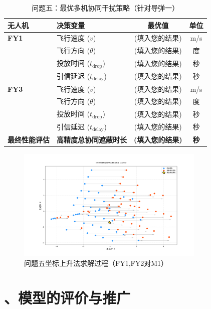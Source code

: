 \documentclass[12pt]{article}
\begin{document}
\begin{CJK}{UTF8}{gbsn}
		\begin{table}[H]
			\centering
			\caption{问题五：最优多机协同干扰策略（针对导弹一）}
			\label{tab:q51_results}
				\begin{tabular}{@{}llcc@{}}
					\toprule
					\textbf{无人机} & \textbf{决策变量} & \textbf{最优值} & \textbf{单位} \\
					\midrule
					\textbf{FY1} & 飞行速度 ($v$) & (填入您的结果) & m/s \\
					& 飞行方向 ($\theta$) & (填入您的结果) & 度 \\
					& 投放时间 ($t_{\text{drop}}$) & (填入您的结果) & 秒 \\
					& 引信延迟 ($t_{\text{delay}}$) & (填入您的结果) & 秒 \\
					\midrule
					\textbf{FY3} & 飞行速度 ($v$) & (填入您的结果) & m/s \\
					& 飞行方向 ($\theta$) & (填入您的结果) & 度 \\
					& 投放时间 ($t_{\text{drop}}$) & (填入您的结果) & 秒 \\
					& 引信延迟 ($t_{\text{delay}}$) & (填入您的结果) & 秒 \\
					\midrule
					\textbf{最终性能评估} & \textbf{高精度总协同遮蔽时长} & \textbf{(填入您的结果)} & \textbf{秒} \\
					\bottomrule
				\end{tabular}
			\end{table}
			
		\begin{figure}[H]
			\centering
			\includegraphics[width=0.8\textwidth]{pic/P51.png}
			\caption{问题五坐标上升法求解过程（FY1,FY2对M1）}
			\label{fig:pca5}
		\end{figure}
			
		\section{、模型的评价与推广}
		

\end{CJK}
\end{document}
